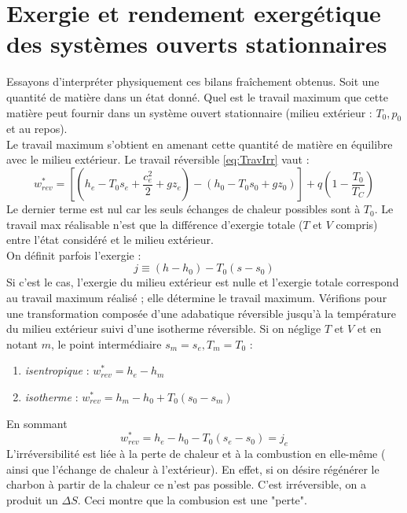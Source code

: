 		
	\newpage
	\section{Exergie et rendement exergétique des systèmes ouverts stationnaires}
	Essayons d’interpréter physiquement ces bilans fraîchement obtenus. Soit une 
	quantité de matière dans un état donné. Quel est le travail maximum que cette 
	matière peut fournir dans un système ouvert stationnaire (milieu extérieur : 
	$T_0,p_0$ et au repos).\\	%
	Le travail maximum s'obtient en amenant cette quantité de matière en équilibre 
	avec le milieu extérieur. Le travail réversible \autoref{eq:TravIrr} vaut :
	\begin{equation}
	w_{rev}^* = \left[\left(h_e-T_0s_e+\dfrac{c_e^2}{2}+gz_e\right) - \left(h_0-T_0s_0
	+gz_0\right)\right] + q\left(1-\dfrac{T_0}{T_C}\right)
	\end{equation}
	Le dernier terme est nul car les seuls échanges de chaleur possibles sont à $T_0$. 
	Le travail max réalisable n'est que la différence d'exergie totale ($T$ et $V$ compris) 
	entre l'état considéré et le milieu extérieur.\\
	On définit parfois l'exergie :
	\begin{equation}
	j \equiv (h-h_0) - T_0(s-s_0)
	\end{equation}
	Si c'est le cas, l'exergie du milieu extérieur est nulle et l'exergie totale 
	correspond au travail maximum réalisé ; elle détermine le travail maximum. Vérifions 
	pour une transformation composée d'une adabatique réversible jusqu'à la température 
	du milieu extérieur suivi d'une isotherme réversible. Si on néglige $T$ et $V$ et 
	en notant $m$, le point intermédiaire $s_m=s_e, T_m=T_0$ :
	\begin{enumerate}
	\item \textit{isentropique} : $w_{rev}^* = h_e-h_m$
 	\item \textit{isotherme} : $w_{rev}^* = h_m-h_0 + T_0(s_0-s_m)$
	\end{enumerate}
	En sommant
	\begin{equation}
	w_{rev}^* = h_e-h_0 - T_0(s_e-s_0) = j_e
	\end{equation}
	L'irréversibilité est liée à la perte de chaleur et à la combustion en elle-même (%
	ainsi que l'échange de chaleur à l'extérieur). En effet, si on désire régénérer 
	le charbon à partir de la chaleur ce n'est pas possible. C'est irréversible, on a 
	produit un $\Delta S$. Ceci montre que la combusion est une "perte".\\
	
